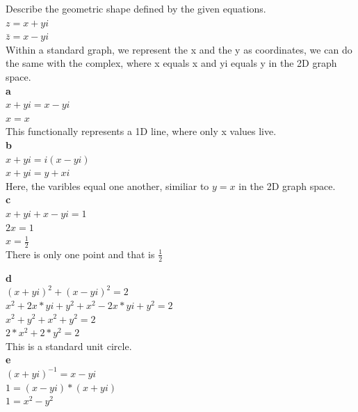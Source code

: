 \documentclass[12pt]{article}
\begin{document}
Describe the geometric shape defined by the given equations.\\

$z = x + yi$\\
$\bar{z} = x - yi$\\

Within a standard graph, we represent the x and the y as coordinates, we can do the same with the complex, where x equals x and yi equals y in the 2D graph space.\\

{\bf a}\\

$x + yi = x - yi$\\
$x = x$\\

This functionally represents a 1D line, where only x values live.\\

{\bf b}\\

$x + yi = i(x - yi)$\\
$x + yi = y + xi$\\

Here, the varibles equal one another, similiar to $y = x$ in the 2D graph space.\\

{\bf c}\\

$x + yi + x - yi = 1$\\
$2x = 1$\\
$x = \frac{1}{2}$\\

There is only one point and that is $\frac{1}{2}$

{\bf d}\\

$(x + yi)^2 + (x - yi)^2 = 2$\\
$x^2 + 2x*yi + y^2 + x^2 - 2x*yi + y^2 = 2$\\
$x^2 + y^2 + x^2 + y^2 = 2$\\
$2*x^2 + 2*y^2  = 2$\\

This is a standard unit circle.\\

{\bf e}\\

$(x+yi)^{-1} = x - yi$\\
$1 = (x - yi) * (x+yi)$\\
$1 = x^2 - y^2 $\\
\end{document}
